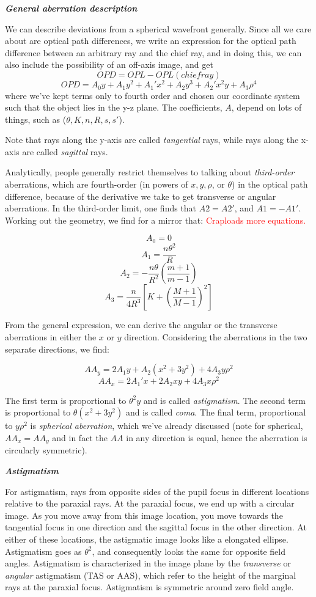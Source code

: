 \documentclass[12pt]{article}
\begin{document}
\textbf{\emph{General aberration description}}

We can describe deviations from a spherical wavefront generally. Since
all we care about are optical path differences, we write an expression
for the optical path difference between an arbitrary ray and the chief
ray, and in doing this, we can also include the possibility of an
off-axis image, and get
$$ OPD = OPL - OPL(chiefray) $$
$$ OPD = A_0y + A_1y^2 + A_1'x^2 + A_2y^3 + A_2'x^2y + A_3\rho^4 $$
where we've kept terms only to fourth order and chosen our coordinate
system such that the object lies in the y-z plane. The coefficients,
$A$, depend on lots of things, such as ($\theta, K, n, R, s, s'$).

Note that rays along the y-axis are called \emph{tangential} rays,
while rays along the x-axis are called \emph{sagittal} rays.

Analytically, people generally restrict themselves to talking about
\emph{third-order} aberrations, which are fourth-order
(in powers of $x, y, \rho$, or $\theta$) in the optical path
difference, because of the derivative we take to get transverse or
angular aberrations. In the third-order limit, one finds that
$A2 = A2'$, and $A1 = -A1'$. Working
out the geometry, we find for a mirror that:
\textcolor{red}{Craploads more equations.}

$$ A_0 = 0 $$
$$ A_1 = \frac{n\theta^2}{R} $$
$$ A_2 = -\frac{n\theta}{R^2}\left(\frac{m+1}{m-1}\right) $$
$$ A_3 = \frac{n}{4R^3}\left[K+\left(\frac{M+1}{M-1}\right)^2 \right] $$

From the general expression, we can derive the angular or the
transverse aberrations in either the $x$ or $y$ direction. Considering the
aberrations in the two separate directions, we find:

$$ AA_y = 2A_1y + A_2(x^2+3y^2) + 4A_3y\rho^2  $$
$$ AA_x = 2A_1'x + 2A_2xy + 4A_3x\rho^2  $$

The first term is proportional to $\theta^{2}y$ and is called
\emph{astigmatism}. The second term is proportional to
$ \theta(x^2 +3y^2)$
and is called \emph{coma}. The final term, proportional to
$y\rho^{2}$
is \emph{spherical aberration}, which we've already discussed (note for
spherical, $AA_x = AA_y$ and in fact the $AA$ in any direction is equal,
hence the aberration is circularly symmetric).

\textbf{\emph{Astigmatism}}

For astigmatism, rays from opposite sides of the pupil focus in
different locations relative to the paraxial rays. At the paraxial
focus, we end up with a circular image. As you move away from this
image location, you move towards the tangential focus in one
direction and the sagittal focus in the other direction. At either of
these locations, the astigmatic image looks like a elongated ellipse.
Astigmatism goes as $\theta^{2}$, and consequently looks the same
for opposite field angles. Astigmatism is characterized in the image
plane by the \emph{transverse} or \emph{angular} astigmatism (TAS or AAS), which
refer to the height of the marginal rays at the paraxial focus.
Astigmatism is symmetric around zero field angle.
\end{document}
